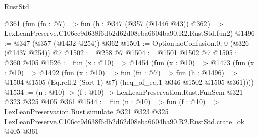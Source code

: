 \begin{lexlean}{RustStd}
\begin{coremodule}
    @361
    (fun (fn : @7) =>
    fun (h : @347 (@357 (@1446 @43)) @362) =>
    LexLeanPreserve.C106cc9d638f6db2d62d08eba6604ba90.R2.RustStd.fun2)
@1496 := @347 (@357 (@1432 @254)) @362
@1501 := Option.noConfusion.{0, 0} (@326 (@1437 @254)) @7
@1502 := @258 @7
@1504 := @1501 @1502 @7
@1505 := @360 @405
@1526 := fun (x : @10) =>
  @1454
    (fun (x : @10) =>
    @1473
      (fun (x : @10) =>
      @1492
        (fun (x : @10) =>
        fun (fn : @7) =>
        fun (h : @1496) =>
        @1504 @1505 (Eq.refl.{2} (Sort 1) @7) (heq_of_eq.{1} @346 @1502 @1505 @361))))
@1534 := (n : @10) -> (f : @10) -> LexLeanPreservation.Rust.FunSem @321 @323 @325 @405 @361
@1544 := fun (n : @10) =>
  fun (f : @10) =>
  LexLeanPreservation.Rust.simulate
    @321
    @323
    @325
    LexLeanPreserve.C106cc9d638f6db2d62d08eba6604ba90.R2.RustStd.crate_ok
    @405
    @361
\end{coremodule}
\end{lexlean}
